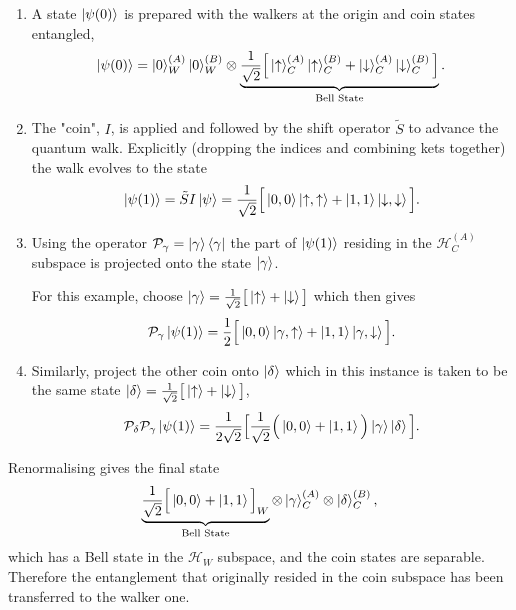 \begin{enumerate}
    \item A state $\ket{\psi(0)}$ is prepared with the walkers at the origin and coin states entangled,
    \begin{equation}
        \ket{\psi(0)} = \ket{0}^{(A)}_W\ket{0}^{(B)}_W \otimes \underbrace{\frac{1}{\sqrt{2}}\Big [\ket{\uparrow}^{(A)}_C\ket{\uparrow}^{(B)}_C + \ket{\downarrow}^{(A)}_C\ket{\downarrow}^{(B)}_C \Big]}_{\text{Bell State}}.
    \end{equation}
    \item The "coin", $I$, is applied and followed by the shift operator $\tilde{S}$ to advance the quantum walk.
    Explicitly (dropping the indices and combining kets together) the walk evolves to the state
    \begin{equation}
        \ket{\psi(1)} = \tilde{S}I\ket{\psi} = \frac{1}{\sqrt{2}}\Big [\ket{0,0}\ket{\uparrow,\uparrow} + \ket{1,1}\ket{\downarrow,\downarrow}\Big].
    \end{equation}
    \item Using the operator $\mathcal{P}_{\gamma} = \ket{\gamma}\bra{\gamma}$ the part of $\ket{\psi(1)}$ residing in the $\mathcal{H}^{(A)}_C$ subspace is projected onto the state $\ket{\gamma}$.
    
    For this example, choose $\ket{\gamma} = \frac{1}{\sqrt{2}} \big [\ket{\uparrow} + \ket{\downarrow} \big]$ which then gives
    \begin{equation}
        \mathcal{P}_\gamma \ket{\psi(1)} = \frac{1}{2}\Big [\ket{0, 0}\ket{\gamma,\uparrow} + \ket{1, 1}\ket{\gamma, \downarrow}\Big ].
    \end{equation}
    \item Similarly, project the other coin onto $\ket{\delta}$ which in this instance is taken to be the same state $\ket{\delta} = \frac{1}{\sqrt{2}} \big [\ket{\uparrow} + \ket{\downarrow} \big]$,
    \begin{equation}
        \mathcal{P}_\delta \mathcal{P}_\gamma \ket{\psi(1)} = \frac{1}{2\sqrt{2}}\Big [\frac{1}{\sqrt{2}}\Big (\ket{0, 0} + \ket{1, 1}\Big )\ket{\gamma}\ket{\delta}\Big].
    \end{equation}
\end{enumerate}
Renormalising gives the final state
\begin{equation}
    \label{equation:qw_transfer_1_final}
    \underbrace{\frac{1}{\sqrt{2}}\Big [\ket{0, 0} + \ket{1, 1}\Big ]_W}_{\text{Bell State}}\otimes \ket{\gamma}^{(A)}_C \otimes \ket{\delta}^{(B)}_C,
\end{equation}
which has a Bell state in the $\mathcal{H}_W$ subspace, and the coin states are separable.
Therefore the entanglement that originally resided in the coin subspace has been transferred to the walker one.

